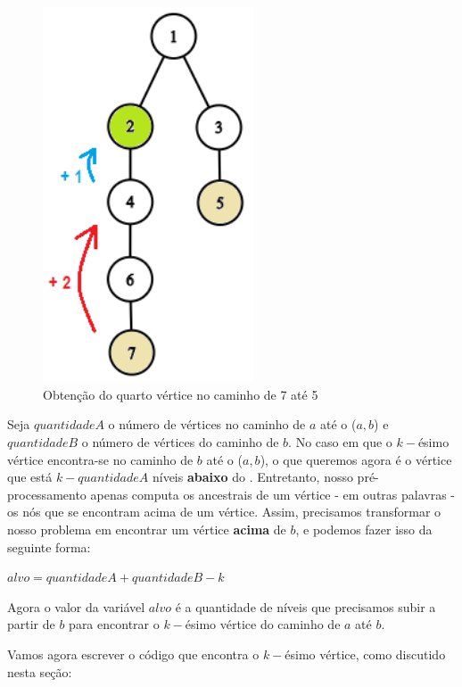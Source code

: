 \begin{figure}[htb]
\begin{center}
\includegraphics[width=6.25cm]{images/qtree2-graph.png}
\end{center}
\caption{\label{fig:arvore-euler2}Obtenção do quarto vértice no caminho de 7 até 5}
\end{figure}

Seja $quantidadeA$ o número de vértices no caminho de $a$ até o \LCA($a, b$) e $quantidadeB$ o número de vértices do caminho de $b$. No caso em que o $k-$ésimo vértice encontra-se no caminho de $b$ até o \LCA($a, b$), o que queremos agora é o vértice que está $k - quantidadeA$ níveis \textbf{abaixo} do \LCA. Entretanto, nosso pré-processamento apenas computa os ancestrais de um vértice - em outras palavras - os nós que se encontram acima de um vértice. Assim, precisamos transformar o nosso problema em encontrar um vértice \textbf{acima} de $b$, e podemos fazer isso da seguinte forma:

\begin{center}
$alvo = quantidadeA + quantidadeB - k$    
\end{center}

Agora o valor da variável $alvo$ é a quantidade de níveis que precisamos subir a partir de $b$ para encontrar o $k-$ésimo vértice do caminho de $a$ até $b$.

Vamos agora escrever o código que encontra o $k-$ésimo vértice, como discutido nesta seção:


